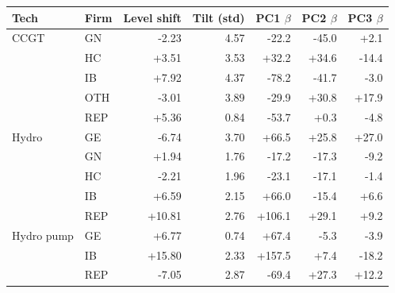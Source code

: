 \begin{tabular}{l l r r r r r}
\toprule
Tech & Firm & Level shift & Tilt (std) & PC1 $\beta$ & PC2 $\beta$ & PC3 $\beta$ \\
\midrule
CCGT & GN & -2.23 & 4.57 & -22.2 & -45.0 & +2.1 \\
 & HC & +3.51 & 3.53 & +32.2 & +34.6 & -14.4 \\
 & IB & +7.92 & 4.37 & -78.2 & -41.7 & -3.0 \\
 & OTH & -3.01 & 3.89 & -29.9 & +30.8 & +17.9 \\
 & REP & +5.36 & 0.84 & -53.7 & +0.3 & -4.8 \\
\addlinespace
Hydro & GE & -6.74 & 3.70 & +66.5 & +25.8 & +27.0 \\
 & GN & +1.94 & 1.76 & -17.2 & -17.3 & -9.2 \\
 & HC & -2.21 & 1.96 & -23.1 & -17.1 & -1.4 \\
 & IB & +6.59 & 2.15 & +66.0 & -15.4 & +6.6 \\
 & REP & +10.81 & 2.76 & +106.1 & +29.1 & +9.2 \\
\addlinespace
Hydro pump & GE & +6.77 & 0.74 & +67.4 & -5.3 & -3.9 \\
 & IB & +15.80 & 2.33 & +157.5 & +7.4 & -18.2 \\
 & REP & -7.05 & 2.87 & -69.4 & +27.3 & +12.2 \\
\bottomrule
\end{tabular}